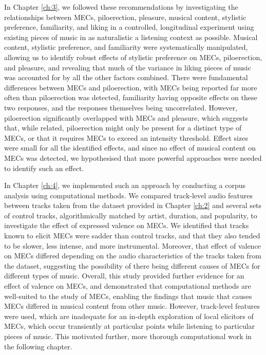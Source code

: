 In Chapter \ref{ch:3}, we followed these recommendations by investigating the relationships between MECs, piloerection, pleasure, musical content, stylistic preference, familiarity, and liking in a controlled, longitudinal experiment using existing pieces of music in as naturalistic a listening context as possible. Musical content, stylistic preference, and familiarity were systematically manipulated, allowing us to identify robust effects of stylistic preference on MECs, piloerection, and pleasure, and revealing that much of the variance in liking pieces of music was accounted for by all the other factors combined. There were fundamental differences between MECs and piloerection, with MECs being reported far more often than piloerection was detected, familiarity having opposite effects on these two responses, and the responses themselves being uncorrelated. However, piloerection significantly overlapped with MECs and pleasure, which suggests that, while related, piloerection might only be present for a distinct type of MECs, or that it requires MECs to exceed an intensity threshold. Effect sizes were small for all the identified effects, and since no effect of musical content on MECs was detected, we hypothesised that more powerful approaches were needed to identify such an effect.

In Chapter \ref{ch:4}, we implemented such an approach by conducting a corpus analysis using computational methods. We compared track-level audio features between tracks taken from the dataset provided in Chapter \ref{ch:2} and several sets of control tracks, algorithmically matched by artist, duration, and popularity, to investigate the effect of expressed valence on MECs. We identified that tracks known to elicit MECs were sadder than control tracks, and that they also tended to be slower, less intense, and more instrumental. Moreover, that effect of valence on MECs differed depending on the audio characteristics of the tracks taken from the dataset, suggesting the possibility of there being different causes of MECs for different types of music. Overall, this study provided further evidence for an effect of valence on MECs, and demonstrated that computational methods are well-suited to the study of MECs, enabling the findings that music that causes MECs differed in musical content from other music. However, track-level features were used, which are inadequate for an in-depth exploration of local elicitors of MECs, which occur transiently at particular points while listening to particular pieces of music. This motivated further, more thorough computational work in the following chapter.

